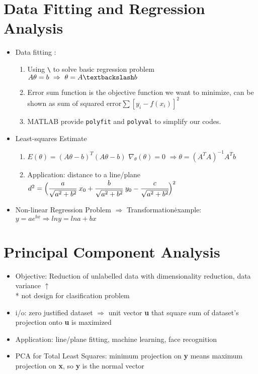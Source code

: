 \documentclass[12pt,a4paper,draft]{article}
\begin{document}
\section{Data Fitting and Regression Analysis} %
\begin{itemize}
\item Data fitting :
\begin{enumerate}
\item Using \texttt{\textbackslash} to solve basic regression problem $A\theta = b\ \Rightarrow \ \theta = A\textbackslash b$
\item Error sum function is the  objective function we want to minimize, can be shown as sum of squared error$\sum [y_i -f(x_i)]^2$
\item MATLAB provide \texttt{polyfit} and \texttt{polyval} to simplify our codes.
\end{enumerate}
\item Least-squares Estimate 
\begin{enumerate}
\item $E(\theta) = (A\theta-b)^T(A\theta-b)$ $\nabla_\theta(\theta) = 0 $ $\Rightarrow \theta = (A^TA)^{-1}A^Tb$
\item Application: distance to a line/plane \\
$d^2 = \Big(\cfrac{a}{\sqrt{a^2+b^2}}\ x_0+\cfrac{b}{\sqrt{a^2+b^2}}\ y_0-\cfrac{c}{\sqrt{a^2+b^2}}\Big)^2$
\end{enumerate}
\item Non-linear Regression Problem
$\Rightarrow $ Transformation\. example: $y=ae^{bx} \Rightarrow ln y=ln a +bx$ 
\end{itemize}
\section{Principal Component Analysis} %
\begin{itemize}
\item Objective: Reduction of unlabelled data with dimensionality reduction, data variance $\uparrow$ \\
* not design for clasification problem
\item i/o: zero justified dataset $\Rightarrow$ unit vector \textbf{u }that square sum of dataset's projection onto \textbf{u} is maximized
\item Application: line/plane fitting, machine learning, face recognition
\item PCA for Total Least Squares: minimum projection on \textbf{y} means maximum projection on \textbf{x}, so \textbf{y} is the normal vector 
\end{itemize}
\end{document}

